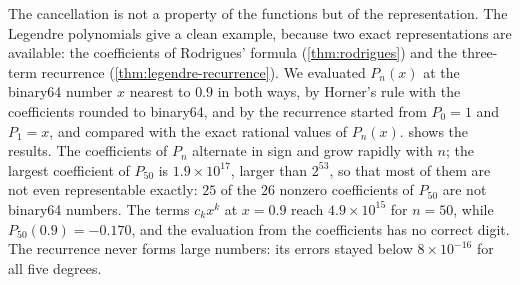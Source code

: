 The cancellation is not a property of the functions but of the representation. The Legendre polynomials give a clean example, because two exact representations are available: the coefficients of Rodrigues' formula (\cref{thm:rodrigues}) and the three-term recurrence (\cref{thm:legendre-recurrence}). We evaluated $P_n(x)$ at the binary64 number $x$ nearest to $0.9$ in both ways, by Horner's rule with the coefficients rounded to binary64, and by the recurrence started from $P_0=1$ and $P_1=x$, and compared with the exact rational values of $P_n(x)$.  shows the results. The coefficients of $P_n$ alternate in sign and grow rapidly with $n$; the largest coefficient of $P_{50}$ is $1.9\times10^{17}$, larger than $2^{53}$, so that most of them are not even representable exactly: $25$ of the $26$ nonzero coefficients of $P_{50}$ are not binary64 numbers. The terms $c_kx^k$ at $x=0.9$ reach $4.9\times10^{15}$ for $n=50$, while $P_{50}(0.9)=-0.170$, and the evaluation from the coefficients has no correct digit. The recurrence never forms large numbers: its errors stayed below $8\times10^{-16}$ for all five degrees.

\begin{table}
\end{table}

